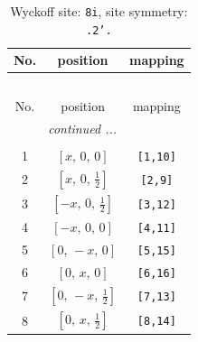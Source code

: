 \documentclass[fleqn,8pt]{jsarticle}
\begin{document}
\renewcommand{\arraystretch}{1.2}
\begin{longtable}{ccc}
\caption{Wyckoff site: {\tt 8i}, site symmetry: {\tt .2'.}}
 \\
 \hline \hline
No. & position & mapping \\ \hline \endfirsthead

\multicolumn{2}{l}{\tablename\ \thetable{}} \\
 \hline \hline
No. & position & mapping \\ \hline \endhead

 \hline \hline
\multicolumn{2}{r}{\footnotesize\it continued ...} \\ \endfoot

 \hline \hline
\multicolumn{2}{r}{} \\ \endlastfoot

1 & $\left[ x,\, 0,\, 0 \right]$ & {\tt [1,10]} \\ \hline
2 & $\left[ x,\, 0,\, \frac{1}{2} \right]$ & {\tt [2,9]} \\ \hline
3 & $\left[ - x,\, 0,\, \frac{1}{2} \right]$ & {\tt [3,12]} \\ \hline
4 & $\left[ - x,\, 0,\, 0 \right]$ & {\tt [4,11]} \\ \hline
5 & $\left[ 0,\, - x,\, 0 \right]$ & {\tt [5,15]} \\ \hline
6 & $\left[ 0,\, x,\, 0 \right]$ & {\tt [6,16]} \\ \hline
7 & $\left[ 0,\, - x,\, \frac{1}{2} \right]$ & {\tt [7,13]} \\ \hline
8 & $\left[ 0,\, x,\, \frac{1}{2} \right]$ & {\tt [8,14]} \\
\end{longtable}
\renewcommand{\arraystretch}{1.2}
\end{document}
